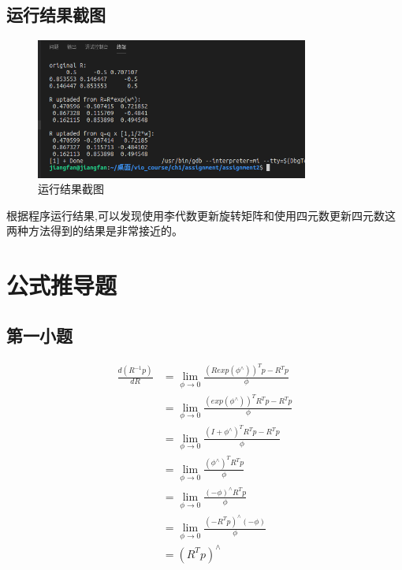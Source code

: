 \documentclass[UTF8]{ctexart}
\begin{document}
\subsection{运行结果截图}
\begin{figure}[h]
\centering
\includegraphics[width = 0.8\textwidth]{2.png}
\caption{运行结果截图}
\end{figure}
\indent 根据程序运行结果,可以发现使用李代数更新旋转矩阵和使用四元数更新四元数这两种方法得到的结果是非常接近的。

\newpage
\section{公式推导题}
\subsection{第一小题}
\begin{equation}
\begin{aligned}
\frac{d(R^{-1}p)}{dR}
&=\lim_{\phi \to 0}\frac{(Rexp(\phi^\wedge))^Tp-R^Tp}{\phi}\\
&=\lim_{\phi \to 0}\frac{(exp(\phi^\wedge))^TR^Tp-R^Tp}{\phi}\\
&=\lim_{\phi \to 0}\frac{(I+\phi^\wedge)^TR^Tp-R^Tp}{\phi}\\
&=\lim_{\phi \to 0}\frac{(\phi^\wedge)^TR^Tp}{\phi}\\
&=\lim_{\phi \to 0}\frac{(-\phi)^{\wedge}R^Tp}{\phi}\\
&=\lim_{\phi \to 0}\frac{(-R^Tp)^{\wedge}{(-\phi)}}{\phi}\\
&=(R^Tp)^\wedge
\end{aligned}
\end{equation}
\end{document}
